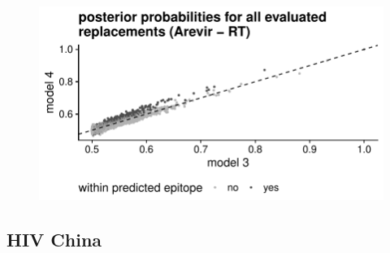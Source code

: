\documentclass[a4paper,11pt]{article}
\begin{document}
\begin{figure}[H]
    \begin{minipage}{.49\textwidth}
      \includegraphics[width=\linewidth]{plots/posterior_p/arevir/rt.pdf}
    \end{minipage}
    \begin{minipage}{.49\textwidth}
    \end{minipage}
\end{figure}

\FloatBarrier
\subsection*{HIV China}
\end{document}
